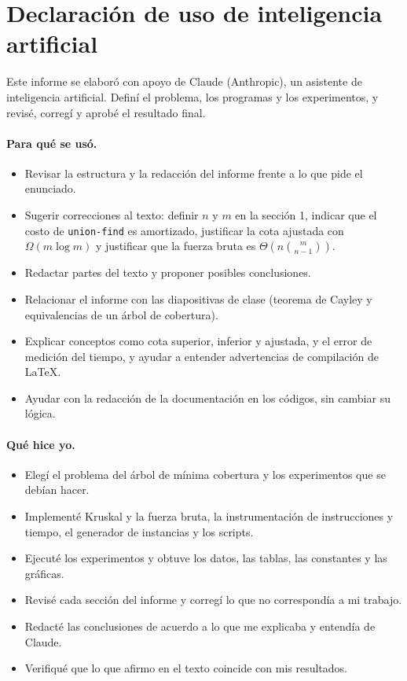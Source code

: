 \documentclass[11pt,a4paper]{article}
\begin{document}
\section{Declaración de uso de inteligencia artificial}
Este informe se elaboró con apoyo de Claude (Anthropic), un asistente de inteligencia artificial. Definí el problema, los programas y los experimentos, y revisé, corregí y aprobé el resultado final.

\paragraph{Para qué se usó.}
\begin{itemize}
  \item Revisar la estructura y la redacción del informe frente a lo que pide el enunciado.
  \item Sugerir correcciones al texto: definir $n$ y $m$ en la sección 1, indicar que el costo de \texttt{union-find} es amortizado, justificar la cota ajustada con $\Omega(m\log m)$ y justificar que la fuerza bruta es $\Theta\!\left(n\binom{m}{n-1}\right)$.
  \item Redactar partes del texto y proponer posibles conclusiones.
  \item Relacionar el informe con las diapositivas de clase (teorema de Cayley y equivalencias de un árbol de cobertura).
  \item Explicar conceptos como cota superior, inferior y ajustada, y el error de medición del tiempo, y ayudar a entender advertencias de compilación de LaTeX.
  \item Ayudar con la redacción de la documentación en los códigos, sin cambiar su lógica.
\end{itemize}

\paragraph{Qué hice yo.}
\begin{itemize}
  \item Elegí el problema del árbol de mínima cobertura y los experimentos que se debían hacer.
  \item Implementé Kruskal y la fuerza bruta, la instrumentación de instrucciones y tiempo, el generador de instancias y los scripts.
  \item Ejecuté los experimentos y obtuve los datos, las tablas, las constantes y las gráficas.
  \item Revisé cada sección del informe y corregí lo que no correspondía a mi trabajo.
  \item Redacté las conclusiones de acuerdo a lo que me explicaba y entendía de Claude.
  \item Verifiqué que lo que afirmo en el texto coincide con mis resultados.
\end{itemize}
\end{document}
